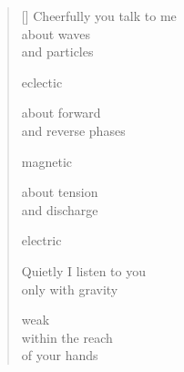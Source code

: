 \documentclass[11pt,a4paper]{article}
\begin{document}
\thispagestyle{empty}

\poemtitle{}

\settowidth{\versewidth}{d'onde et de particules}

\bigskip

\begin{verse}[\versewidth]
  Cheerfully you talk to me \\
  about waves \\
  and particles

  eclectic

  about forward \\
  and reverse phases

  magnetic

  about tension \\
  and discharge

  electric

  Quietly I listen to you \\
  only with gravity

  weak \\
  within the reach \\
  of your hands
\end{verse}
\end{document}
